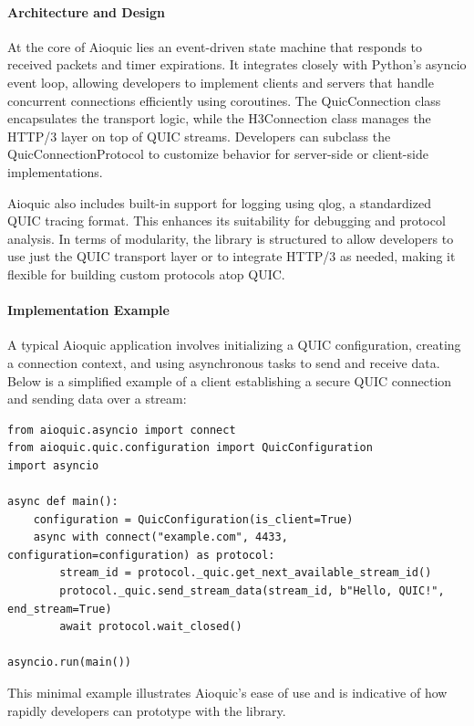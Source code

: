 \paragraph{Architecture and Design}
At the core of Aioquic lies an event-driven state machine that responds to received packets and timer expirations. It integrates closely with Python's asyncio event loop, allowing developers to implement clients and servers that handle concurrent connections efficiently using coroutines. The QuicConnection class encapsulates the transport logic, while the H3Connection class manages the HTTP/3 layer on top of QUIC streams. Developers can subclass the QuicConnectionProtocol to customize behavior for server-side or client-side implementations.

Aioquic also includes built-in support for logging using qlog, a standardized QUIC tracing format. This enhances its suitability for debugging and protocol analysis. In terms of modularity, the library is structured to allow developers to use just the QUIC transport layer or to integrate HTTP/3 as needed, making it flexible for building custom protocols atop QUIC.

\paragraph{Implementation Example}
A typical Aioquic application involves initializing a QUIC configuration, creating a connection context, and using asynchronous tasks to send and receive data. Below is a simplified example of a client establishing a secure QUIC connection and sending data over a stream:

\begin{lstlisting}[breaklines=true,basicstyle=\small\ttfamily,frame=single]
from aioquic.asyncio import connect
from aioquic.quic.configuration import QuicConfiguration
import asyncio

async def main():
    configuration = QuicConfiguration(is_client=True)
    async with connect("example.com", 4433, configuration=configuration) as protocol:
        stream_id = protocol._quic.get_next_available_stream_id()
        protocol._quic.send_stream_data(stream_id, b"Hello, QUIC!", end_stream=True)
        await protocol.wait_closed()

asyncio.run(main())
\end{lstlisting}

This minimal example illustrates Aioquic's ease of use and is indicative of how rapidly developers can prototype with the library.

